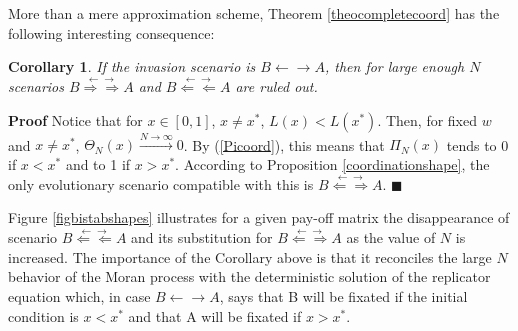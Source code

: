 \documentclass[12pt]{article}
\newtheorem{corollary}{Corollary}
\begin{document}
More than a mere approximation scheme, Theorem \ref{theocompletecoord} has the following interesting consequence:
\begin{corollary}
	If the invasion scenario is $B\leftarrow \rightarrow A$, then for large enough $N$ scenarios $B\stackrel{\leftarrow \rightarrow}{\Rightarrow \Rightarrow} A$ and $B\stackrel{\leftarrow \rightarrow}{\Leftarrow \Leftarrow} A$ are ruled out.  
\end{corollary}
\textbf{Proof}
Notice that for $x \in[0,1]$, $x \neq x^{\ast}$, $L(x)<L(x^{\ast})$. Then, for fixed $w$ and $x \neq x^{\ast}$, $\Theta_N(x) \stackrel{N \rightarrow \infty}{\rightarrow}0$. By (\ref{Picoord}), this means that $\Pi_N(x)$ tends to 0 if $x < x^{\ast}$ and to 1 if $x>x^{\ast}$. According to Proposition \ref{coordinationshape}, the only evolutionary scenario compatible with this is  $B\stackrel{\leftarrow \rightarrow}{\Leftarrow \Rightarrow} A$.
$\blacksquare$	

Figure \ref{figbistabshapes} illustrates for a given pay-off matrix the disappearance of scenario $B\stackrel{\leftarrow \rightarrow}{\Leftarrow \Leftarrow} A$ and its substitution for $B\stackrel{\leftarrow \rightarrow}{\Leftarrow \Rightarrow} A$ as the value of $N$ is increased. The importance of the Corollary above is that it reconciles the large $N$ behavior of the Moran process with the deterministic solution of the replicator equation which, in case $B\leftarrow \rightarrow A$, says that B will be fixated if the initial condition is $x<x^{\ast}$ and that A will be fixated if $x>x^{\ast}$.
\end{document}
